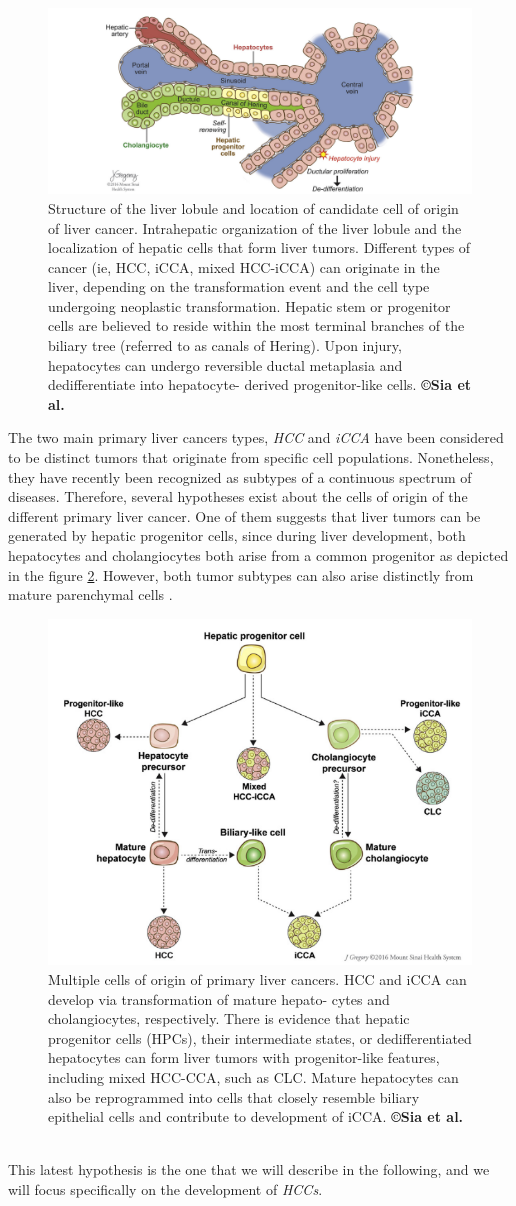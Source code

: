 \documentclass[]{article}
\begin{document}
\begin{figure}[th!]
\centering
\includegraphics[width=0.7\linewidth]{images/image8}
\caption{Structure of the liver lobule and location of candidate cell of origin of liver cancer. Intrahepatic organization of the liver lobule and the localization of hepatic cells that form liver tumors. Different types of cancer (ie, HCC, iCCA, mixed HCC-iCCA) can originate in the liver, depending on the transformation event and the cell type undergoing neoplastic transformation. Hepatic stem or progenitor cells are believed to reside within the most terminal branches of the biliary tree (referred to as canals of Hering). Upon injury, hepatocytes can undergo reversible ductal metaplasia and dedifferentiate into hepatocyte- derived progenitor-like cells. \textbf{©Sia et al.} \cite{Sia2017}}
\label{Sia2017_Fig2}
\end{figure}
The two main primary liver cancers types, \emph{HCC} and \emph{iCCA}
have been considered to be distinct tumors that originate from specific
cell populations. Nonetheless, they have recently been recognized as
subtypes of a continuous spectrum of diseases. Therefore, several
hypotheses exist about the cells of origin of the different primary
liver cancer.
One of them suggests that liver tumors can be generated by hepatic
progenitor cells, since during liver development, both hepatocytes and
cholangiocytes both arise from a common progenitor as depicted in the figure \ref{Sia2017_Fig3}.
However, both tumor subtypes can also arise distinctly from mature
parenchymal cells \cite{Sia2017}.
\begin{figure}[th!]
\centering
\includegraphics[width=0.3\linewidth]{images/image13}
\caption{Multiple cells of origin of primary liver cancers. HCC and iCCA can develop via transformation of mature hepato- cytes and cholangiocytes, respectively. There is evidence that hepatic progenitor cells (HPCs), their intermediate states, or dedifferentiated hepatocytes can form liver tumors with progenitor-like features, including mixed HCC-CCA, such as CLC. Mature hepatocytes can also be reprogrammed into cells that closely resemble biliary epithelial cells and contribute to development of iCCA. \textbf{©Sia et al.} \cite{Sia2017}}
\label{Sia2017_Fig3}
\end{figure}\\
This latest hypothesis is the one that we will describe in the
following, and we will focus specifically on the development of
\emph{HCCs}.
\end{document}
